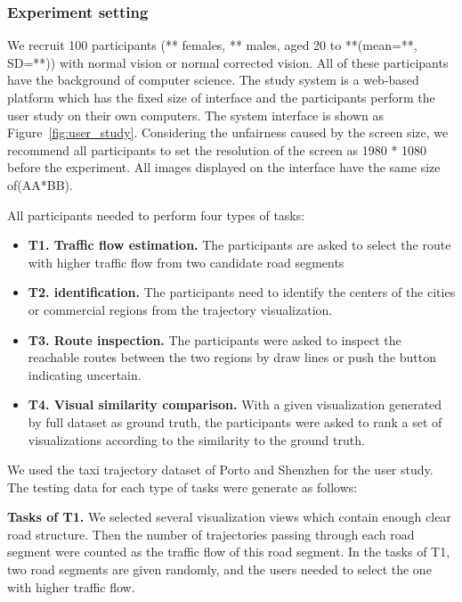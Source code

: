 \subsubsection{Experiment setting}

We recruit 100 participants (** females, ** males, aged 20 to **(mean=**, SD=**)) with normal vision or normal corrected vision. All of these participants have the background of computer science. 
The study system is a web-based platform which has the fixed size of interface and the participants perform the user study on their own  computers.  The system interface is shown as Figure~\ref{fig:user_study}. Considering the unfairness caused by the screen size, we recommend all participants to set the resolution of the screen as 1980 * 1080 before the experiment. All images displayed on the interface have the same size of(AA*BB).  

All participants needed to perform four types of tasks:
\begin{itemize}[noitemsep]
	\item \textbf{T1. Traffic flow estimation.} 
	The participants are asked to select the route with higher traffic flow from two candidate road segments
	\item \textbf{T2.  identification.} The participants need to identify the centers of the cities or commercial regions from the trajectory visualization.
	\item \textbf{T3. Route inspection.} The participants were asked to inspect the reachable routes between the two regions by draw lines or push the button indicating uncertain.
	\item \textbf{T4. Visual similarity comparison.} With a given visualization generated by full dataset as ground truth, the participants were asked to rank a set of visualizations according to the similarity to the ground truth. 
\end{itemize}

We used the taxi trajectory dataset of Porto and Shenzhen for the user study. The testing data for each type of tasks were generate as follows:

\textbf{Tasks of T1.} We selected several visualization views which contain enough clear road structure. Then the number of trajectories passing through each road segment were counted as the traffic flow of this road segment. In the tasks of T1, two road segments are given randomly, and the users needed to select the one with higher traffic flow.  

